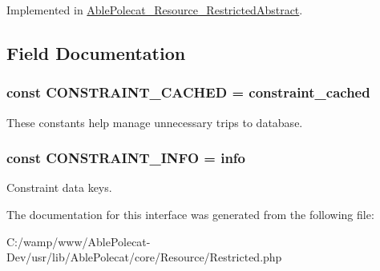 Implemented in \hyperlink{class_able_polecat___resource___restricted_abstract_a645291218d5ad4046d1367bb9718867f}{Able\+Polecat\+\_\+\+Resource\+\_\+\+Restricted\+Abstract}.



\subsection{Field Documentation}
\hypertarget{interface_able_polecat___resource___restricted_interface_ab27573795ab9be601eaa1e5264d56f79}{}
\subsubsection[{C\+O\+N\+S\+T\+R\+A\+I\+N\+T\+\_\+\+C\+A\+C\+H\+E\+D}]{\setlength{\rightskip}{0pt plus 5cm}const C\+O\+N\+S\+T\+R\+A\+I\+N\+T\+\_\+\+C\+A\+C\+H\+E\+D = \textquotesingle{}constraint\+\_\+cached\textquotesingle{}}\label{interface_able_polecat___resource___restricted_interface_ab27573795ab9be601eaa1e5264d56f79}
These constants help manage unnecessary trips to database. \hypertarget{interface_able_polecat___resource___restricted_interface_a3a1aa131b9d97400218b513393474376}{}
\subsubsection[{C\+O\+N\+S\+T\+R\+A\+I\+N\+T\+\_\+\+I\+N\+F\+O}]{\setlength{\rightskip}{0pt plus 5cm}const C\+O\+N\+S\+T\+R\+A\+I\+N\+T\+\_\+\+I\+N\+F\+O = \textquotesingle{}info\textquotesingle{}}\label{interface_able_polecat___resource___restricted_interface_a3a1aa131b9d97400218b513393474376}
Constraint data keys. 

The documentation for this interface was generated from the following file\+:\begin{DoxyCompactItemize}
\item 
C\+:/wamp/www/\+Able\+Polecat-\/\+Dev/usr/lib/\+Able\+Polecat/core/\+Resource/Restricted.\+php\end{DoxyCompactItemize}
